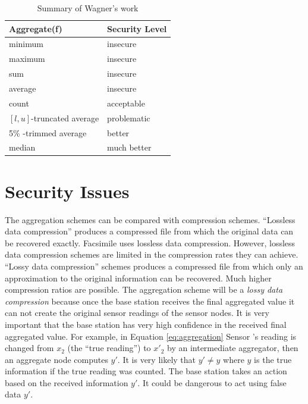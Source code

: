 	\begin{table}[!htb]	
		\begin{center}
		\caption{Summary of Wagner's work}
			\begin{tabular}{ |l| l| }
				\hline
			    Aggregate(f) & Security Level \\
			    \hline
			    minimum & insecure \\
			    maximum & insecure \\
			    sum & insecure \\
				average & insecure \\
				count & acceptable \\
				$[l,u]$-truncated average & problematic \\
				5\% -trimmed average & better \\
				median & much better \\
			    \hline
			\end{tabular}
		\end{center}
		\label{table:wagner}
	\end{table}

\section{Security Issues}
	\label{sec:security-issues}
	
	The aggregation schemes can be compared with compression schemes.
	``Lossless data compression'' \cite{alberto2000communication} produces a compressed file from which the original data can be recovered exactly.
	Facsimile uses lossless data compression.
	However, lossless data compression schemes are limited in the compression rates they can achieve.
	``Lossy data compression'' \cite{alberto2000communication} schemes produces a compressed file from which only an approximation to the original information can be recovered. Much higher compression ratios are possible.
	The aggregation scheme will be a \textit{lossy data compression} because once the base station receives the final aggregated value it can not create the original sensor readings of the sensor nodes.
	It is very important that the base station has very high confidence in the received final aggregated value. 
	For example, in Equation \ref{eq:aggregation} Sensor 's reading is changed from $x_{2}$ (the ``true reading'') to $x'_{2}$ by an intermediate aggregator, then an aggregate node computes $y'$.
	It is very likely that $y' \neq y$ where $y$ is the true information if the true reading was counted.
	The base station takes an action based on the received information $y'$.
	It could be dangerous to act using false data $y'$.

